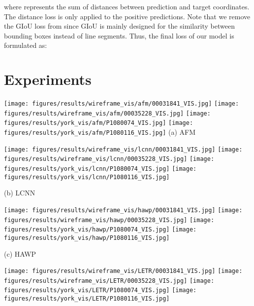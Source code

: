 \documentclass[final]{cvpr}
\begin{document}
where  represents the sum of  distances between prediction and target coordinates. The distance loss is only applied to the positive predictions. Note that we remove the GIoU loss from \cite{carion2020end} since GIoU is mainly designed for the similarity between bounding boxes instead of line segments. Thus, the final loss  of our model is formulated as:



\vspace{-2mm}
\section{Experiments}

\begin{figure*}
    \centering\hfill
    \begin{minipage}[t]{0.19\linewidth}\centering 
    \texttt{[image: figures/results/wireframe\_vis/afm/00031841\_VIS.jpg]} 
    \texttt{[image: figures/results/wireframe\_vis/afm/00035228\_VIS.jpg]} 
    \texttt{[image: figures/results/york\_vis/afm/P1080074\_VIS.jpg]} 
    \texttt{[image: figures/results/york\_vis/afm/P1080116\_VIS.jpg]} 
    {\small (a) AFM \cite{xue2019learning}}
    \end{minipage}\hfill
    \begin{minipage}[t]{0.19\linewidth}\centering
    \texttt{[image: figures/results/wireframe\_vis/lcnn/00031841\_VIS.jpg]} 
    \texttt{[image: figures/results/wireframe\_vis/lcnn/00035228\_VIS.jpg]} 
    \texttt{[image: figures/results/york\_vis/lcnn/P1080074\_VIS.jpg]}
    \texttt{[image: figures/results/york\_vis/lcnn/P1080116\_VIS.jpg]}
    
    {\small (b) LCNN \cite{zhou2019end}}
    \end{minipage}\hfill
    \begin{minipage}[t]{0.19\linewidth}\centering
    \texttt{[image: figures/results/wireframe\_vis/hawp/00031841\_VIS.jpg]}
    \texttt{[image: figures/results/wireframe\_vis/hawp/00035228\_VIS.jpg]}
    \texttt{[image: figures/results/york\_vis/hawp/P1080074\_VIS.jpg]}
    \texttt{[image: figures/results/york\_vis/hawp/P1080116\_VIS.jpg]}    
    
    {\small (c) HAWP \cite{xue2020holistically}}
    \end{minipage}\hfill
    \begin{minipage}[t]{0.19\linewidth}\centering
    \texttt{[image: figures/results/wireframe\_vis/LETR/00031841\_VIS.jpg]}
    \texttt{[image: figures/results/wireframe\_vis/LETR/00035228\_VIS.jpg]}
    \texttt{[image: figures/results/york\_vis/LETR/P1080074\_VIS.jpg]}
    \texttt{[image: figures/results/york\_vis/LETR/P1080116\_VIS.jpg]}
    

\end{minipage}
\end{figure*}
\end{document}
